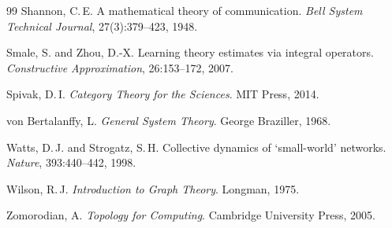 \documentclass[12pt,oneside]{article}
\theoremstyle{plain}
\theoremstyle{definition}
\theoremstyle{remark}
\theoremstyle{plain}
\begin{document}
\begin{thebibliography}{99}
Shannon, C.\,E.
\newblock A mathematical theory of communication.
\newblock \emph{Bell System Technical Journal}, 27(3):379--423, 1948.

Smale, S. and Zhou, D.-X.
\newblock Learning theory estimates via integral operators.
\newblock \emph{Constructive Approximation}, 26:153--172, 2007.

Spivak, D.\,I.
\newblock \emph{Category Theory for the Sciences}.
\newblock MIT Press, 2014.

von Bertalanffy, L.
\newblock \emph{General System Theory}.
\newblock George Braziller, 1968.

Watts, D.\,J. and Strogatz, S.\,H.
\newblock Collective dynamics of `small-world' networks.
\newblock \emph{Nature}, 393:440--442, 1998.

Wilson, R.\,J.
\newblock \emph{Introduction to Graph Theory}.
\newblock Longman, 1975.

Zomorodian, A.
\newblock \emph{Topology for Computing}.
\newblock Cambridge University Press, 2005.

\end{thebibliography}
\end{document}
